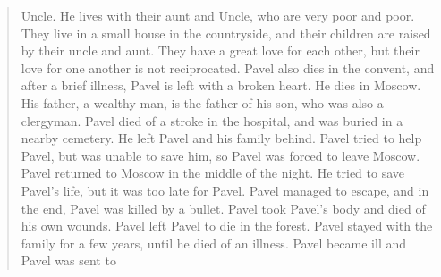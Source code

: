 \documentclass{article}
\begin{document}
\begin{quote}
Uncle. He lives with their aunt and Uncle, who are very poor and poor. They live in a small house in the countryside, and their children are raised by their uncle and aunt. They have a great love for each other, but their love for one another is not reciprocated. Pavel also dies in the convent, and after a brief illness, Pavel is left with a broken heart. He dies in Moscow. His father, a wealthy man, is the father of his son, who was also a clergyman. Pavel died of a stroke in the hospital, and was buried in a nearby cemetery. He left Pavel and his family behind. Pavel tried to help Pavel, but was unable to save him, so Pavel was forced to leave Moscow. Pavel returned to Moscow in the middle of the night. He tried to save Pavel's life, but it was too late for Pavel. Pavel managed to escape, and in the end, Pavel was killed by a bullet. Pavel took Pavel's body and died of his own wounds. Pavel left Pavel to die in the forest. Pavel stayed with the family for a few years, until he died of an illness. Pavel became ill and Pavel was sent to

\end{quote}
\end{document}
